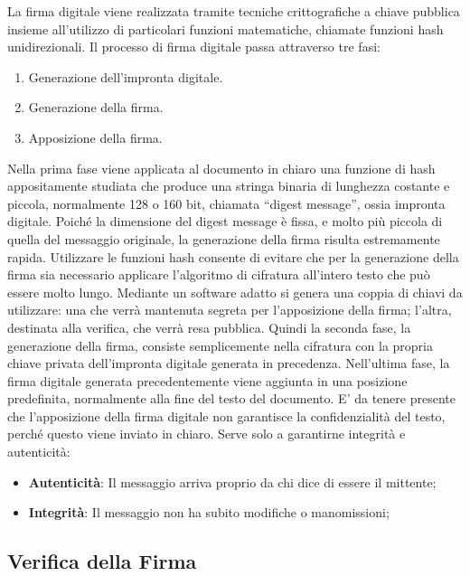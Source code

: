 La firma digitale viene realizzata tramite tecniche
crittografiche a
chiave pubblica insieme all'utilizzo di particolari
funzioni matematiche, chiamate funzioni hash
unidirezionali. Il processo di firma digitale passa
attraverso tre fasi:

\begin{enumerate}
    \item Generazione dell'impronta digitale.
    \item Generazione della firma.
    \item Apposizione della firma.
\end{enumerate}

Nella prima fase viene applicata al documento in
chiaro una funzione di hash appositamente
studiata che produce una stringa binaria di
lunghezza costante e piccola, normalmente 128 o 160
bit, chiamata “digest message”, ossia impronta
digitale.
Poiché la dimensione del digest message è fissa,
e molto più piccola di quella del messaggio
originale, la generazione della firma risulta
estremamente rapida. Utilizzare le funzioni hash
consente di evitare che per la generazione della
firma sia necessario applicare l'algoritmo di
cifratura all'intero testo che può essere molto lungo.
Mediante un software adatto si genera una coppia di
chiavi da utilizzare: una che verrà mantenuta
segreta per l'apposizione della firma; l'altra, destinata alla verifica, che
verrà resa pubblica. Quindi
la seconda fase, la generazione della firma, consiste semplicemente nella
cifratura con la propria
chiave privata dell'impronta digitale generata in precedenza.
Nell'ultima fase, la firma digitale generata precedentemente viene aggiunta in
una posizione
predefinita, normalmente alla fine del testo del documento.
E' da tenere presente che l'apposizione della firma digitale non garantisce la
confidenzialità del
testo, perché questo viene inviato in chiaro. Serve solo a garantirne integrità
e autenticità:

\begin{itemize}
    \item \textbf{Autenticità}: Il messaggio arriva proprio da chi dice di essere il mittente;
    \item \textbf{Integrità}: Il messaggio non ha subito modifiche o manomissioni;
\end{itemize}

\subsection{Verifica della Firma}

